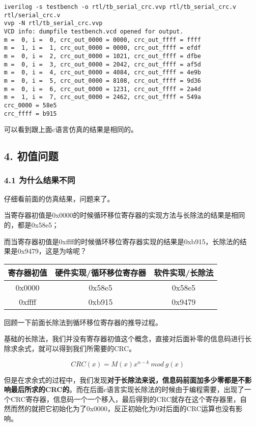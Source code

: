 \documentclass[
]{article}
\begin{document}
\begin{verbatim}
iverilog -s testbench -o rtl/tb_serial_crc.vvp rtl/tb_serial_crc.v rtl/serial_crc.v
vvp -N rtl/tb_serial_crc.vvp
VCD info: dumpfile testbench.vcd opened for output.
m =  0, i =  0, crc_out_0000 = 0000, crc_out_ffff = ffff
m =  1, i =  1, crc_out_0000 = 0000, crc_out_ffff = efdf
m =  0, i =  2, crc_out_0000 = 1021, crc_out_ffff = dfbe
m =  0, i =  3, crc_out_0000 = 2042, crc_out_ffff = af5d
m =  0, i =  4, crc_out_0000 = 4084, crc_out_ffff = 4e9b
m =  0, i =  5, crc_out_0000 = 8108, crc_out_ffff = 9d36
m =  0, i =  6, crc_out_0000 = 1231, crc_out_ffff = 2a4d
m =  1, i =  7, crc_out_0000 = 2462, crc_out_ffff = 549a
crc_0000 = 58e5
crc_ffff = b915
\end{verbatim}

可以看到跟上面c语言仿真的结果是相同的。

\newpage
\hypertarget{header-n172}{%
\subsection{4. 初值问题}\label{header-n172}}

\hypertarget{header-n173}{%
\subsubsection{4.1 为什么结果不同}\label{header-n173}}

仔细看前面的仿真结果，问题来了。

当寄存器初值是0x0000的时候循环移位寄存器的实现方法与长除法的结果是相同的，都是0x58e5；

而当寄存器初值是0xffff的时候循环移位寄存器实现的结果是0xb915，长除法的结果是0x9479，这是为啥呢？

\begin{longtable}[]{@{}ccc@{}}
\toprule
寄存器初值 & 硬件实现/循环移位寄存器 & 软件实现/长除法\tabularnewline
\midrule
\endhead
0x0000 & 0x58e5 & 0x58e5\tabularnewline
0xffff & 0xb915 & 0x9479\tabularnewline
\bottomrule
\end{longtable}

回顾一下前面长除法到循环移位寄存器的推导过程。

基础的长除法，我们并没有寄存器初值这个概念，直接对后面补零的信息码进行长除求余式，就可以得到我们所需要的CRC。

\begin{equation}
CRC(x)=M(x)x^{n-k} \: mod \: g(x)
\end{equation}

但是在求余式的过程中，我们发现\textbf{对于长除法来说，信息码前面加多少零都是不影响最后所求的CRC的}。而在后面c语言实现长除法的时候由于编程需要，出现了一个CRC寄存器，信息码一个一个移入，最后得到的CRC就存在这个寄存器里，自然而然的就把它初始化为了0x0000，反正初始化为0对后面的CRC运算也没有影响。
\end{document}
